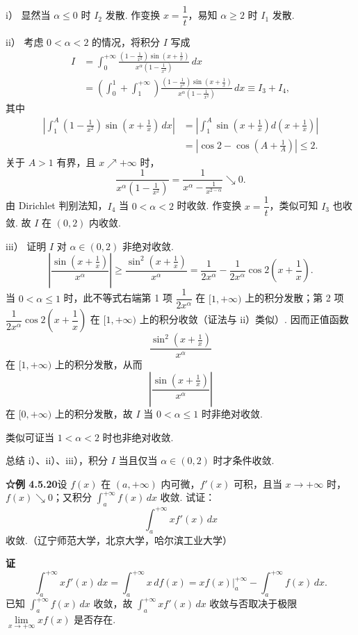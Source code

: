 \documentclass[UTF8,12pt,a4paper,fontset=fandol]{ctexart}
\begin{document}
i） 显然当 $\alpha\le0$ 时 $I_2$ 发散. 作变换 $x=\dfrac1t$，易知 $\alpha\ge2$ 时 $I_1$ 发散.

ii） 考虑 $0<\alpha<2$ 的情况，将积分 $I$ 写成
\[
\begin{aligned}
I&=\int_0^{+\infty}
\frac{\left(1-\frac1{x^2}\right)\sin\left(x+\frac1x\right)}
{x^\alpha\left(1-\frac1{x^2}\right)}\,dx\\
&=\left(\int_0^1+\int_1^{+\infty}\right)
\frac{\left(1-\frac1{x^2}\right)\sin\left(x+\frac1x\right)}
{x^\alpha\left(1-\frac1{x^2}\right)}\,dx
\equiv I_3+I_4,
\end{aligned}
\]
其中
\[
\begin{aligned}
\left|\int_1^A\left(1-\frac1{x^2}\right)
\sin\left(x+\frac1x\right)\,dx\right|
&=\left|\int_1^A\sin\left(x+\frac1x\right)d\left(x+\frac1x\right)\right|\\
&=\left|\cos2-\cos\left(A+\frac1A\right)\right|\le2.
\end{aligned}
\]
关于 $A>1$ 有界，且 $x\nearrow+\infty$ 时，
\[
\frac1{x^\alpha\left(1-\frac1{x^2}\right)}
=\frac1{x^\alpha-\frac1{x^{2-\alpha}}}\searrow0.
\]
由 Dirichlet 判别法知，$I_4$ 当 $0<\alpha<2$ 时收敛. 作变换 $x=\dfrac1t$，类似可知 $I_3$ 也收敛. 故 $I$ 在 $(0,2)$ 内收敛.

iii） 证明 $I$ 对 $\alpha\in(0,2)$ 非绝对收敛.
\[
\left|\frac{\sin\left(x+\frac1x\right)}{x^\alpha}\right|
\ge\frac{\sin^2\left(x+\frac1x\right)}{x^\alpha}
=\frac1{2x^\alpha}-\frac1{2x^\alpha}\cos2\left(x+\frac1x\right).
\]
当 $0<\alpha\le1$ 时，此不等式右端第 1 项 $\dfrac1{2x^\alpha}$ 在 $[1,+\infty)$ 上的积分发散；第 2 项 $\dfrac1{2x^\alpha}\cos2\left(x+\dfrac1x\right)$ 在 $[1,+\infty)$ 上的积分收敛（证法与 ii）类似）. 因而正值函数
\[
\frac{\sin^2\left(x+\frac1x\right)}{x^\alpha}
\]
在 $[1,+\infty)$ 上的积分发散，从而
\[
\left|\frac{\sin\left(x+\frac1x\right)}{x^\alpha}\right|
\]
在 $[0,+\infty)$ 上的积分发散，故 $I$ 当 $0<\alpha\le1$ 时非绝对收敛.

类似可证当 $1<\alpha<2$ 时也非绝对收敛.

总结 i）、ii）、iii），积分 $I$ 当且仅当 $\alpha\in(0,2)$ 时才条件收敛.

\noindent\textbf{☆例 4.5.20}\quad 设 $f(x)$ 在 $(a,+\infty)$ 内可微，$f'(x)$ 可积，且当 $x\to+\infty$ 时，$f(x)\searrow0$；又积分 $\displaystyle\int_a^{+\infty}f(x)\,dx$ 收敛. 试证：
\[
\int_a^{+\infty}xf'(x)\,dx
\]
收敛.（辽宁师范大学，北京大学，哈尔滨工业大学）

\noindent\textbf{证}\quad
\[
\int_a^{+\infty}xf'(x)\,dx
=\int_a^{+\infty}x\,df(x)
=xf(x)\Big|_a^{+\infty}-\int_a^{+\infty}f(x)\,dx.
\]
已知 $\displaystyle\int_a^{+\infty}f(x)\,dx$ 收敛，故 $\displaystyle\int_a^{+\infty}xf'(x)\,dx$ 收敛与否取决于极限 $\lim\limits_{x\to+\infty}xf(x)$ 是否存在.
\end{document}
